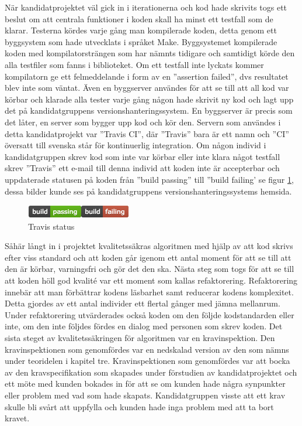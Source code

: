 När kandidatprojektet väl gick in i iterationerna och kod hade skrivits togs ett beslut om att centrala funktioner i koden skall ha minst ett testfall som de klarar. Testerna kördes varje gång man kompilerade koden, detta genom ett byggsystem som hade utvecklats i språket Make. Byggsystemet kompilerade koden med kompilatorsträngen som har nämnts tidigare och samtidigt körde den alla testfiler som fanns i biblioteket. Om ett testfall inte lyckats kommer kompilatorn ge ett felmeddelande i form av en ''assertion failed'', dvs resultatet blev inte som väntat. Även en byggserver användes för att se till att all kod var körbar och klarade alla tester varje gång någon hade skrivit ny kod och lagt upp det på kandidatgruppens versionshanteringssystem. En  byggserver är precis som det låter, en server som bygger upp kod och kör den. Servern som användes i detta kandidatprojekt var ''Travis CI'', där ''Travis'' bara är ett namn och ''CI'' översatt till svenska står för kontinuerlig integration. Om någon individ i kandidatgruppen skrev kod som inte var körbar eller inte klara något testfall skrev ''Travis'' ett e-mail till denna individ att koden inte är accepterbar och uppdaterade statusen på koden från ''build passing'' till ''build failing' se figur \ref{fig:travisstatus}, dessa bilder kunde ses på kandidatgruppens versionshanteringssystems hemsida.
\begin{figure}[h]
\centerline{\includegraphics[scale=0.8]{ruben-tex/graphic/travisstatus}}
\caption{Travis status}
\label{fig:travisstatus}
\end{figure}
\newline
Såhär långt in i projektet kvalitetssäkras algoritmen med hjälp av att kod skrivs efter viss standard och att koden går igenom ett antal moment för att se till att den är körbar, varningsfri och gör det den ska. Nästa steg som togs för att se till att koden höll god kvalité var ett moment som kallas refaktorering. Refaktorering innebär att man förbättrar kodens läsbarhet samt reducerar kodens komplexitet. Detta gjordes av ett antal individer ett flertal gånger med jämna mellanrum. Under refaktorering utvärderades också koden om den följde kodstandarden eller inte, om den inte följdes fördes en dialog med personen som skrev koden.
\newline
\newline
Det sista steget av kvalitetssäkringen för algoritmen var en kravinspektion. Den kravinspektionen som genomfördes var en nedskalad version av den som nämns under teoridelen i kapitel tre. Kravinspektionen som genomfördes var att bocka av den kravspecifikation som skapades under förstudien av kandidatprojektet och ett möte med kunden bokades in för att se om kunden hade några synpunkter eller problem med vad som hade skapats. Kandidatgruppen visste att ett krav skulle bli svårt att uppfylla och kunden hade inga problem med att ta bort kravet.

